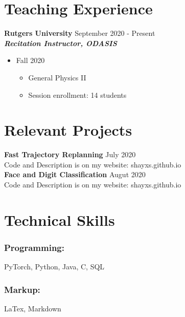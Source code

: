 \documentclass{article}
\begin{document}
\section{Teaching Experience}
\textbf{Rutgers University}
\hfill{September 2020 - Present}\\
\textit{\textbf{Recitation Instructor, ODASIS}}
\begin{itemize}
  \item Fall 2020
  \begin{itemize}
 	 \item General Physics II
 	 \item Session enrollment: 14 students
  \end{itemize}
\end{itemize}


\section{Relevant Projects}
\textbf{Fast Trajectory Replanning}
\hfill{July 2020}\\
Code and Description is on my website: shayxs.github.io\\

\noindent \textbf{Face and Digit Classification}
\hfill{Augut 2020}\\
Code and Description is on my website: shayxs.github.io

\section{Technical Skills}

\subsubsection{Programming:}

PyTorch, Python, Java, C, SQL

\subsubsection{Markup:}

LaTex, Markdown
\end{document}
